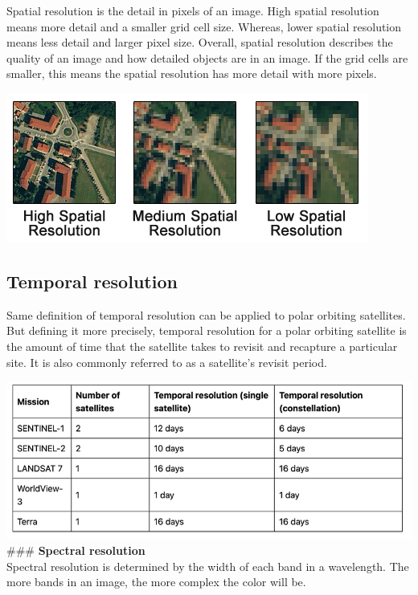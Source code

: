 \documentclass[
]{book}
\begin{document}
Spatial resolution is the detail in pixels of an image. High spatial resolution means more detail and a smaller grid cell size. Whereas, lower spatial resolution means less detail and larger pixel size. Overall, spatial resolution describes the quality of an image and how detailed objects are in an image. If the grid cells are smaller, this means the spatial resolution has more detail with more pixels.

\includegraphics{images/Spatial-Resolution-Comparison.png}

\hypertarget{temporal-resolution}{%
\subsection{\texorpdfstring{\textbf{Temporal resolution}}{Temporal resolution}}\label{temporal-resolution}}

Same definition of temporal resolution can be applied to polar orbiting satellites. But defining it more precisely, temporal resolution for a polar orbiting satellite is the amount of time that the satellite takes to revisit and recapture a particular site. It is also commonly referred to as a satellite's revisit period.

\includegraphics{images/temporal-resolution.png}
\#\#\# \textbf{Spectral resolution}\\

Spectral resolution is determined by the width of each band in a wavelength. The more bands in an image, the more complex the color will be.
\end{document}
